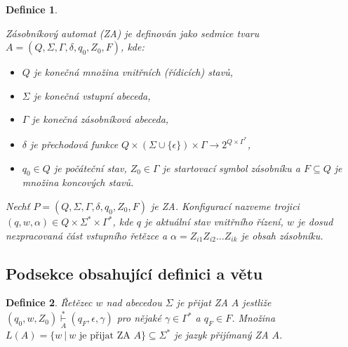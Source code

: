 \documentclass[a4paper, twocolumn, 11pt]{article}
\theoremstyle{plain}
\newtheorem{definition}{Definice}
\begin{document}
\begin{definition}\label{def:zasobnikovy-automat}

	\emph{Zásobníkový automat} (ZA) je definován jako sedmice tvaru
	$A = (Q, \Sigma, \Gamma, \delta, q_0, Z_0, F)$, kde:

	\begin{itemize}

		\item $Q$ je konečná množina \emph{vnitřních (řídicích) stavů},

		\item $\Sigma$ je konečná \emph{vstupní abeceda},

		\item $\Gamma$ je konečná \emph{zásobníková abeceda},

		\item $\delta$ je \emph{přechodová funkce}
		      $Q \times \left( \Sigma \cup \{ \epsilon \} \right) \times
			      \Gamma \rightarrow 2^{Q \times \Gamma^\ast} $,

		\item $q_0 \in Q$ je \emph{počáteční stav},
		      $Z_0 \in \Gamma$ je \emph{startovací symbol zásobníku}
		      a $F \subseteq Q$ je množina \emph{koncových stavů}.

	\end{itemize}

	\normalfont{}
	Nechť $P = (Q, \Sigma, \Gamma, \delta, q_0, Z_0, F)$ je ZA.
	\emph{Konfigurací} nazveme trojici
	$(q, w, \alpha) \in Q \times \Sigma^\ast \times \Gamma^\ast$, kde
	$q$ je aktuální stav vnitřního řízení,
	$w$ je dosud nezpracovaná část vstupního řetězce
	a $\alpha = Z_{i1} Z_{i2} \ldots Z_{ik}$ je obsah zásobníku.

\end{definition}

\subsection{Podsekce obsahující definici a větu}

\begin{definition}

	\emph{Řetězec $w$ nad abecedou $\Sigma$ je přijat ZA} $A$ jestliže
	${(q_0, w, Z_0) \underset{A}{\overset{*}{\vdash}} (q_F, \epsilon, \gamma)}$ pro nějaké
	${\gamma \in \Gamma^\ast}$ a ${q_F \in F}$.
	Množina $L(A) = \{ w\ |\ w \text{ je přijat ZA } A \} \subseteq \Sigma^\ast$
	je \emph{jazyk přijímaný ZA} $A$.

\end{definition}
\end{document}
